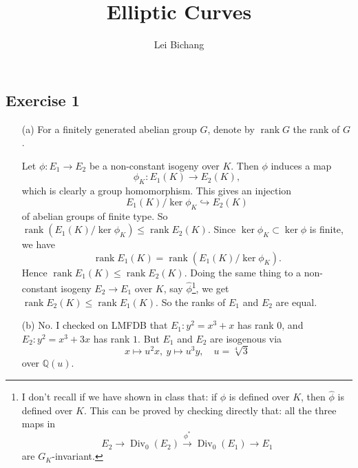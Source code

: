 \documentclass{article}
\title{Elliptic Curves}
\author{Lei Bichang}
\theoremstyle{definition}
\theoremstyle{remark}
\newcommand{\Q}{\mathbb{Q}}
\DeclareMathOperator{\rank}{rank} %
\DeclareMathOperator{\Div}{Div}
\begin{document}
\maketitle

\subsection*{Exercise 1}
\begin{enumerate}
\item [(a)] 
For a finitely generated abelian group $G$,
denote by $\rank G$ the rank of $G$.

Let $\phi : E_1\to E_2$ be a non-constant isogeny over $K$.
Then $\phi$ induces a map
\[\phi_K : E_1(K)\to E_2(K),\]
which is clearly a group homomorphism.
This gives an injection \[E_1(K)/\ker\phi_K\hookrightarrow E_2(K)\] of abelian groups of finite type.
So $\rank (E_1(K)/\ker\phi_K)\le \rank E_2(K)$.
Since $\ker\phi_K \subset \ker\phi$ is finite,
we have \[\rank E_1(K) = \rank (E_1(K)/\ker\phi_K).\]
Hence $\rank E_1(K)\le \rank E_2(K)$.
Doing the same thing to a non-constant isogeny $E_2\to E_1$ over $K$,
say $\hat{\phi}$\footnote{
I don't recall if we have shown in class that: if $\phi$ is defined over $K$,
then $\hat{\phi}$ is defined over $K$.
This can be proved by checking directly that: all the three maps in
\[E_2\to\Div_0(E_2)\stackrel{\phi^*}{\to}\Div_0(E_1)\to E_1\]
are $G_K$-invariant.},
we get $\rank E_2(K)\le \rank E_1(K)$.
So the ranks of $E_1$ and $E_2$ are equal.
\item [(b)]
No.
I checked on LMFDB that $E_1 : y^2 = x^3 + x$ has rank $0$, and $E_2 : y^2 = x^3 + 3x$ has rank $1$.
But $E_1$ and $E_2$ are isogenous via \[x\mapsto u^{2}x,\ y\mapsto u^3y,\quad u = \sqrt[4]{3}\]
over $\Q(u)$.

\end{enumerate}
\end{document}
